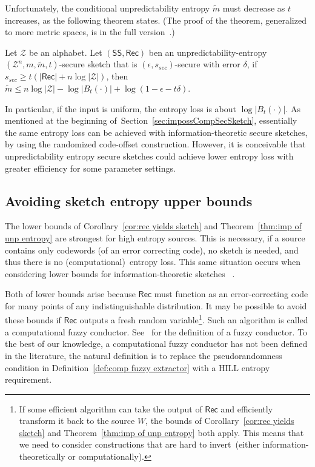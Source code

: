 \documentclass{llncs}
\newcommand{\secref}[1]{\mbox{Section~\ref{#1}}}
\newcommand{\thref}[1]{\mbox{Theorem~\ref{#1}}}
\newcommand{\defref}[1]{\mbox{Definition~\ref{#1}}}
\newcommand{\corref}[1]{\mbox{Corollary~\ref{#1}}}
\newcommand{\class}[1]{{\ensuremath{\mathsf{#1}}}}
\newcommand{\sketch}{\ensuremath{\class{SS}}\xspace}
\newcommand{\rec}{\ensuremath{\class{Rec}}\xspace}
\begin{document}
Unfortunately, the conditional unpredictability entropy $\tilde{m}$ must decrease as $t$ increases, as the following theorem states.  (The proof of the theorem, generalized to more metric spaces, is in the full version~\cite{fullerMengReyzin2013}.)

\begin{theorem}
\label{thm:imp of unp entropy}
Let $\mathcal{Z}$ be an alphabet. Let $(\sketch, \rec)$ ben an unpredictability-entropy $(\mathcal{Z}^n, m, \tilde{m}, t)$-secure sketch that is $(\epsilon, s_{sec})$-secure with error $\delta$, if $s_{sec} \geq t(|\rec|+n\log |\mathcal{Z}|)$, then $\tilde{m}\leq n\log |\mathcal{Z}| - \log |B_t(\cdot)| + \log(1-\epsilon -t\delta)$.
\end{theorem}
In particular, if the input is uniform, the entropy loss is about $\log |B_t(\cdot)|$.  As mentioned at the beginning of~\secref{sec:impossCompSecSketch}, essentially the same entropy loss can be achieved with information-theoretic secure sketches, by using the randomized code-offset construction. However, it is conceivable that unpredictability entropy secure sketches could achieve lower entropy loss with greater efficiency for some parameter settings.

\subsection{Avoiding sketch entropy upper bounds}
\label{ssec:avoiding bounds}

The lower bounds of \corref{cor:rec yields sketch} and \thref{thm:imp of unp entropy} are strongest for high entropy sources.  
This is necessary, if a source contains only codewords (of an error correcting code), no sketch is needed, and thus there is no (computational)~entropy loss.  
This same situation occurs when considering lower bounds for information-theoretic sketches~\cite[Appendix C]{DBLP:journals/siamcomp/DodisORS08} .

Both of lower bounds arise because \rec must function as an error-correcting code for many points of any indistinguishable distribution.  It may be possible to avoid these bounds if \rec outputs a fresh random variable\footnote{If some efficient algorithm can take the output of $\rec$ and efficiently transform it back to the source $W$, the bounds of \corref{cor:rec yields sketch} and \thref{thm:imp of unp entropy} both apply.  This means that we need to consider constructions that are hard to invert~(either information-theoretically or computationally).}.  Such an algorithm is called a computational fuzzy conductor.  See~\cite{KanukurthiR09} for the definition of a fuzzy conductor.  To the best of our knowledge, a computational fuzzy conductor has not been defined in the literature, the natural definition is to replace the pseudorandomness condition in \defref{def:comp fuzzy extractor} with a HILL entropy requirement.  
\end{document}
